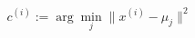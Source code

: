 \documentclass[preview]{standalone}
\begin{document}
\begin{align*}
c^{(i)}:=\arg\min_{j}\|x^{(i)}-\mu_{j}\|^{2}
\end{align*}
\end{document}
